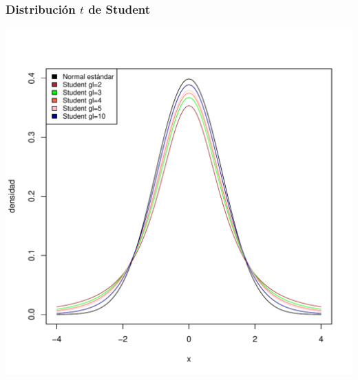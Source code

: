 \documentclass[12pt,t]{beamer}\usepackage[]{graphicx}\usepackage[]{color}
\makeatletter
\def\maxwidth{ %
  \ifdim\Gin@nat@width>\linewidth
    \linewidth
  \else
    \Gin@nat@width
  \fi
}
\newenvironment{knitrout}{}{} %
\theoremstyle{plain}
\theoremstyle{definition}
\makeatother
\begin{document}
\begin{frame}
\frametitle{Distribución $t$ de Student}
\vspace*{-1cm}


\begin{knitrout}
\color{fgcolor}
\includegraphics[width=\maxwidth]{figure/plotStudent-1} 

\end{knitrout}



\end{frame}
\end{document}
